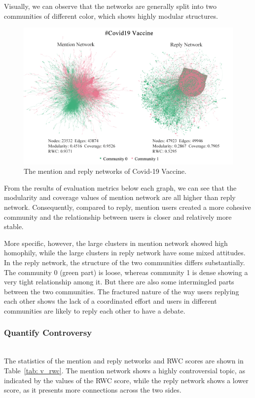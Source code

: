 \documentclass[sigplan,screen]{acmart}
\begin{document}
Visually, we can observe that the networks are generally split into two communities of different color, which shows highly modular structures.

\begin{figure}[h]
  \centering
  \includegraphics[width=0.9\linewidth]{resource/xiaoliang/v_m_r.png}
  \caption{The mention and reply networks of Covid-19 Vaccine.}
  \label{fig:v}
\end{figure}

From the results of evaluation metrics below each graph, we can see that the modularity and coverage values of mention network are all higher than reply network. Consequently, compared to reply, mention users created a more cohesive community and the relationship between users is closer and relatively more stable.

More specific, however, the large clusters in mention network showed high homophily, while the large clusters in reply network have some mixed attitudes. In the reply network, the structure of the two communities differs substantially. The community 0 (green part) is loose, whereas community 1 is dense showing a very tight relationship among it. But there are also some intermingled parts between the two communities. The fractured nature of the way users replying each other shows the lack of a coordinated effort and users in different communities are likely to reply each other to have a debate.

\subsubsection{Quantify Controversy}
~\\
The statistics of the mention and reply networks and RWC scores are shown in Table~\ref{tab: v_rwc}. The mention network shows a highly controversial topic, as indicated by the values of the RWC score, while the reply network shows a lower score, as it presents more connections across the two sides. 
\end{document}
